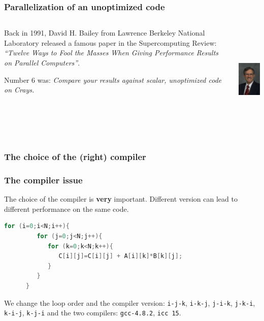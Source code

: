 \begin{frame}
\frametitle{Parallelization of an unoptimized code}

\begin{columns}
\begin{column}{7cm}
Back in 1991, David H. Bailey from Lawrence Berkeley National Laboratory released a famous paper in the Supercomputing Review: \textit{``Twelve Ways to Fool the Masses When Giving Performance Results on Parallel Computers''}.

\begin{block}{}
Number 6 was: \textit{Compare your results against scalar, unoptimized code on Crays.}
\end{block}

\end{column}
\begin{column}[c]{3cm}
{\includegraphics[height=5.3cm]{Day1/images/dhb.jpg}}
\end{column}
\end{columns}

\end{frame}


\subsubsection{The choice of the (right) compiler}

\begin{frame}[containsverbatim]
\frametitle{The compiler issue}
\label{compilerissue}
\begin{block}{}
The choice of the compiler is \textbf{very} important. Different version can lead to different performance on the same code.
\end{block}

\begin{lstlisting}[language=C,frame=lines]
      for (i=0;i<N;i++){
         for (j=0;j<N;j++){
            for (k=0;k<N;k++){
               C[i][j]=C[i][j] + A[i][k]*B[k][j];
            }
         }
      }
\end{lstlisting}

\begin{block}{}
We change the loop order and the compiler version: \texttt{i-j-k}, \texttt{i-k-j}, \texttt{j-i-k}, \texttt{j-k-i}, \texttt{k-i-j}, \texttt{k-j-i} and the two compilers: \texttt{gcc-4.8.2}, \texttt{icc 15}.
\end{block}

\end{frame}

